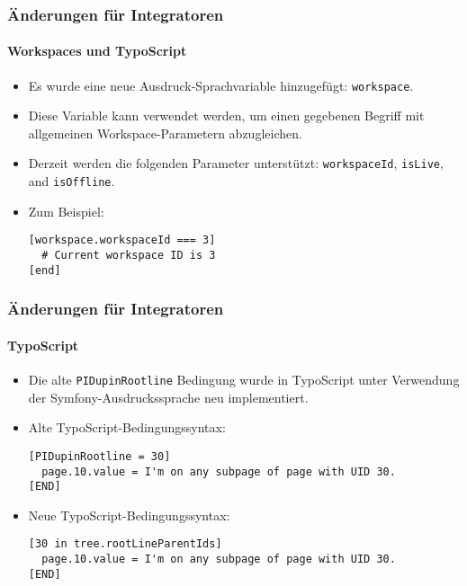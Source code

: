 \begin{frame}[fragile]
	\frametitle{Änderungen für Integratoren}
	\framesubtitle{Workspaces und TypoScript}

	\lstset{basicstyle=\smaller\ttfamily}

	\begin{itemize}
		\item Es wurde eine neue Ausdruck-Sprachvariable hinzugefügt: \texttt{workspace}.
		\item Diese Variable kann verwendet werden, um einen gegebenen Begriff mit allgemeinen Workspace-Parametern abzugleichen.
		\item Derzeit werden die folgenden Parameter unterstützt:\newline
			\small
				\texttt{workspaceId}, \texttt{isLive}, and \texttt{isOffline}.
			\normalsize
		\item Zum Beispiel:

\vspace{-0.4cm}
\begin{lstlisting}
[workspace.workspaceId === 3]
  # Current workspace ID is 3
[end]
\end{lstlisting}

	\end{itemize}

\end{frame}


\begin{frame}[fragile]
	\frametitle{Änderungen für Integratoren}
	\framesubtitle{TypoScript}

	\lstset{basicstyle=\smaller\ttfamily}

	\begin{itemize}
		\item Die alte \texttt{PIDupinRootline} Bedingung wurde in TypoScript
			unter Verwendung der Symfony-Ausdruckssprache neu implementiert.
		\item Alte TypoScript-Bedingungssyntax:

\vspace{-0.4cm}
\begin{lstlisting}
[PIDupinRootline = 30]
  page.10.value = I'm on any subpage of page with UID 30.
[END]
\end{lstlisting}

		\item Neue TypoScript-Bedingungssyntax:

\vspace{-0.4cm}
\begin{lstlisting}
[30 in tree.rootLineParentIds]
  page.10.value = I'm on any subpage of page with UID 30.
[END]
\end{lstlisting}

	\end{itemize}

\end{frame}

